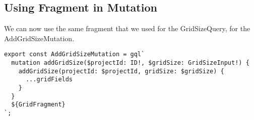 \subsection{ Using Fragment in Mutation }
We can now use the same fragment that we used for the GridSizeQuery, for the
AddGridSizeMutation.

\begin{lstlisting}
export const AddGridSizeMutation = gql`
  mutation addGridSize($projectId: ID!, $gridSize: GridSizeInput!) {
    addGridSize(projectId: $projectId, gridSize: $gridSize) {
      ...gridFields
    }
  }
  ${GridFragment}
`;
\end{lstlisting}
